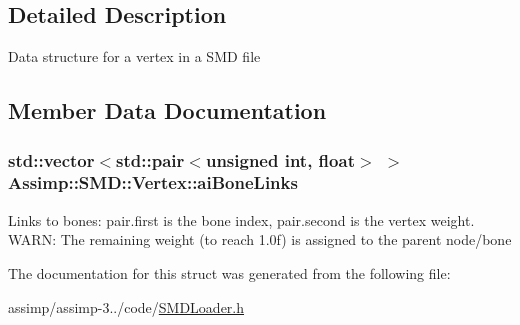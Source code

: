 \subsection{Detailed Description}
Data structure for a vertex in a S\+M\+D file 

\subsection{Member Data Documentation}
\hypertarget{struct_assimp_1_1_s_m_d_1_1_vertex_a7811d20e6dfde235c93223dd16b37bc9}{
\subsubsection[{ai\+Bone\+Links}]{\setlength{\rightskip}{0pt plus 5cm}std\+::vector$<$std\+::pair$<$unsigned int, float$>$ $>$ Assimp\+::\+S\+M\+D\+::\+Vertex\+::ai\+Bone\+Links}}\label{struct_assimp_1_1_s_m_d_1_1_vertex_a7811d20e6dfde235c93223dd16b37bc9}
Links to bones\+: pair.\+first is the bone index, pair.\+second is the vertex weight. W\+A\+R\+N\+: The remaining weight (to reach 1.\+0f) is assigned to the parent node/bone 

The documentation for this struct was generated from the following file\+:\begin{DoxyCompactItemize}
\item 
assimp/assimp-\/3../code/\hyperlink{_s_m_d_loader_8h}{S\+M\+D\+Loader.\+h}\end{DoxyCompactItemize}
